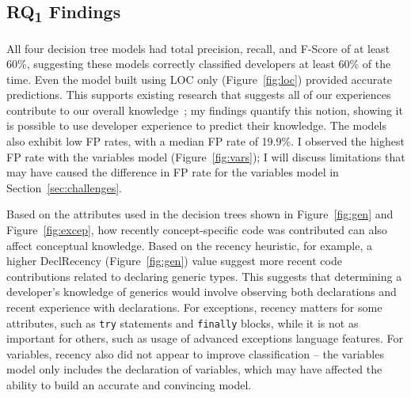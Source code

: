 \subsection{RQ\textsubscript{1} Findings}

All four decision tree models had total precision, recall, and F-Score of at least 60\%, suggesting these models correctly classified developers at least 60\% of the time. Even the model built using LOC only (Figure~\ref{fig:loc}) provided accurate predictions. 
This supports existing research that suggests all of our experiences contribute to our overall knowledge~\cite{argote2011organizational}; my findings quantify this notion, showing it is possible to use developer experience to predict their knowledge.
The models also exhibit low FP rates, with a median FP rate of 19.9\%. I observed the highest FP rate with the variables model (Figure~\ref{fig:vars}); I will discuss limitations that may have caused the difference in FP rate for the variables model in Section~\ref{sec:challenges}.

Based on the attributes used in the decision trees shown in Figure~\ref{fig:gen} and Figure~\ref{fig:excep}, how recently concept-specific code was contributed can also affect conceptual knowledge. Based on the recency heuristic, for example, a higher DeclRecency (Figure~\ref{fig:gen}) value suggest more recent code contributions related to declaring generic types. This suggests that determining a developer's knowledge of generics would involve observing both declarations and recent experience with declarations. For exceptions, recency matters for some attributes, such as \texttt{try} statements and \texttt{finally} blocks, while it is not as important for others, such as usage of advanced exceptions language features. For variables, recency also did not appear to improve classification -- the variables model only includes the declaration of variables, which may have affected the ability to build an accurate and convincing model. 

\vspace{1em}

\vspace{0.5em}


